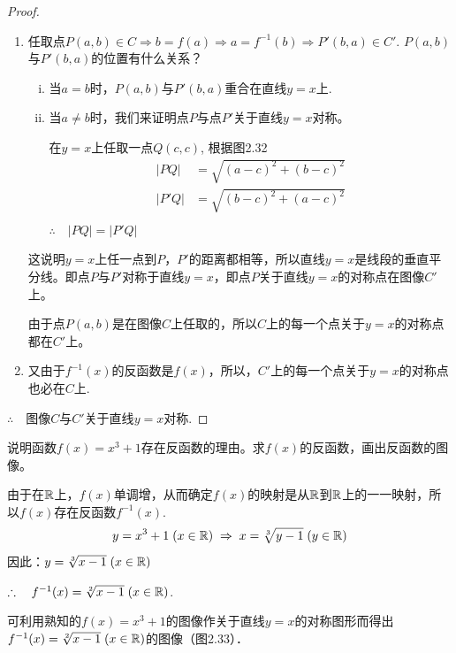 \begin{proof}
\begin{enumerate}[(1)]
    \item 任取点$P(a,b)\in C\Longrightarrow b=f(a)\Longrightarrow a=f^{-1}(b)\Longrightarrow P'(b,a)\in C'$. $P(a,b)$与$P'(b,a)$的位置有什么关系？
\begin{enumerate}[(i)]
    \item 当$a=b$时，$P(a,b)$与$P'(b,a)$重合在直线$y=x$上.
    \item 当$a\ne b$时，我们来证明点$P$与点$P'$关于直线$y=x$对称。
    
    在$y=x$上任取一点$Q(c,c)$, 根据图2.32
\[\begin{split}
    |PQ|&=\sqrt{(a-c)^2+(b-c)^2}\\
    |P'Q|&=\sqrt{(b-c)^2+(a-c)^2}\\
\end{split}\]
$\therefore\quad |PQ|=|P'Q|$
\end{enumerate}

\begin{figure}[htp]
    \centering
{}
    \caption{}
\end{figure}


这说明$y=x$上任一点到$P$，$P'$的距离都相等，所以直线$y=x$是线段的垂直平分线。即点$P$与$P'$对称于直线$y=x$，即点$P$关于直线$y=x$的对称点在图像$C'$上。

由于点$P(a,b)$是在图像$C$上任取的，所以$C$上的每一个点关于$y=x$的对称点都在$C'$上。

\item 又由于$f^{-1}(x)$的反函数是$f(x)$，所以，$C'$上的每一个点关于$y=x$的对称点也必在$C$上.
\end{enumerate}

$\therefore\quad $图像$C$与$C'$关于直线$y=x$对称.
\end{proof}

\begin{example}
说明函数$f(x)=x^3+1$存在反函数的理由。求$f(x)$的反函数，画出反函数的图像。   
\end{example}

\begin{solution}
由于在$\mathbb{R}$上，$f(x)$单调增，从而确定$f(x)$的映射是从$\mathbb{R}$到$\mathbb{R}$上的一一映射，所以$f(x)$存在反函数$f^{-1}(x)$.
\[y=x^3+1\; (x\in\mathbb{R})\;\Rightarrow\; x=\sqrt[3]{y-1}\; (y\in\mathbb{R})\]
因此：$y=\sqrt[3]{x-1}\; (x\in\mathbb{R})$

$\therefore\quad f^{-1}(x)=\sqrt[2]{x-1}\; (x\in\mathbb{R})$.

可利用熟知的$f(x)=x^3+1$的图像作关于直线$y=x$的对称图形而得出$f^{-1}(x)= \sqrt[2]{x-1}\; (x\in\mathbb{R})$的图像（图2.33）．
\end{solution}    

